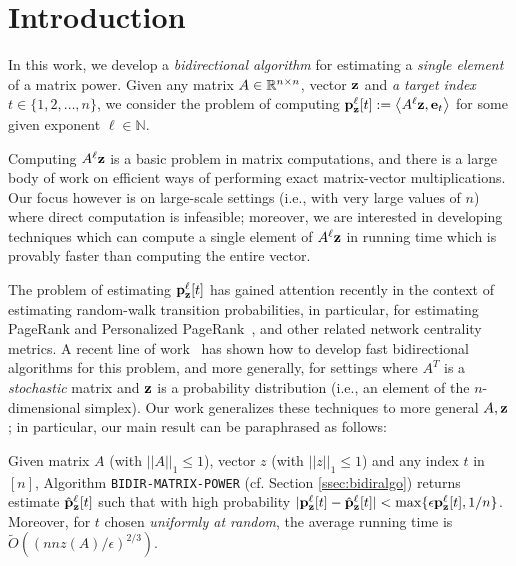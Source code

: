 \section{Introduction}

In this work, we develop a \emph{bidirectional algorithm} for estimating a \emph{single element} of a matrix power.
Given any matrix $A\in\mathbb{R}^{n\times n}$, vector $\mathbf{z}$ and \emph{a target index $t\in\{1,2,\ldots,n\}$}, we consider the problem of computing ${\mathbf{p}}_\mathbf{z}^{\ell}[t] := \left< A^{\ell}\mathbf{z}, \mathbf{e}_t \right>$ for some given exponent $\ell\in\mathbb{N}$.

Computing $A^{\ell}\mathbf{z}$ is a basic problem in matrix computations, and there is a large body of work on efficient ways of performing exact matrix-vector multiplications. 
Our focus however is on large-scale settings (i.e., with very large values of $n$) where direct computation is infeasible; moreover, we are interested in developing techniques which can compute a single element of $A^{\ell}\mathbf{z}$ in running time which is provably faster than computing the entire vector. 

The problem of estimating ${\mathbf{p}}_\mathbf{z}^{\ell}[t]$ has gained attention recently in the context of estimating random-walk transition probabilities, in particular, for estimating PageRank and Personalized PageRank~\cite{Page1999}, and other related network centrality metrics. 
A recent line of work~\cite{Lofgren2014,lofgren2016personalized,banerjee2015fast} has shown how to develop fast bidirectional algorithms for this problem, and more generally, for settings where $A^T$ is a \emph{stochastic} matrix and $\mathbf{z}$ is a probability distribution (i.e., an element of the $n$-dimensional simplex).
Our work generalizes these techniques to more general $A,\mathbf{z}$; in particular, our main result can be paraphrased as follows:
\begin{proposition}
Given matrix $A$ (with $||A||_1\leq 1$), vector $z$ (with $||z||_1\leq 1$) and any index $t$ in $[n]$, Algorithm \texttt{BIDIR-MATRIX-POWER} (cf. Section \ref{ssec:bidiralgo}) returns estimate $\hat{\mathbf{p}}_\mathbf{z}^{\ell}[t]$ such that with high probability $|{\mathbf{p}}_\mathbf{z}^{\ell}[t]-\hat{\mathbf{p}}_\mathbf{z}^{\ell}[t]|<\max\{\epsilon{\mathbf{p}}_\mathbf{z}^{\ell}[t],1/n\}$.
Moreover, for $t$ chosen \emph{uniformly at random}, the average running time is $\widetilde{O}\left(\left(nnz(A)/\epsilon\right)^{2/3}\right)$.
\end{proposition}	



